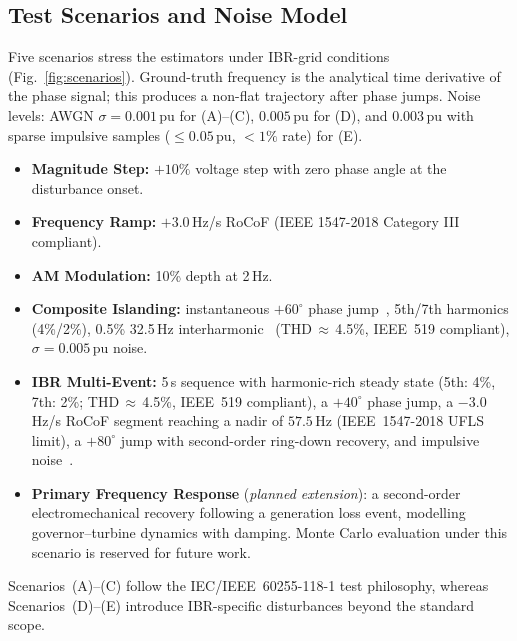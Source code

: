 \subsection{Test Scenarios and Noise Model}
\label{sec:scenarios}

Five scenarios stress the estimators under IBR-grid conditions
(Fig.~\ref{fig:scenarios}). Ground-truth frequency is the analytical
time derivative of the phase signal; this produces a non-flat trajectory
after phase jumps. Noise levels: AWGN $\sigma=0.001$\,pu for (A)--(C),
$0.005$\,pu for (D), and $0.003$\,pu with sparse impulsive samples
($\leq\!0.05$\,pu, $<\!1\%$ rate) for (E).
%
\begin{itemize}[leftmargin=*, nosep, topsep=1pt, itemsep=1pt]
  \item[\textbf{(A)}] \textbf{Magnitude Step:} $+10\%$ voltage step with
    zero phase angle at the disturbance onset.
  \item[\textbf{(B)}] \textbf{Frequency Ramp:} $+3.0$\,Hz/s RoCoF (IEEE 1547-2018 Category III compliant).
  \item[\textbf{(C)}] \textbf{AM Modulation:} 10\% depth at 2\,Hz.
  \item[\textbf{(D)}] \textbf{Composite Islanding:} instantaneous
    $+60^\circ$ phase jump~\cite{Roscoe2019}, 5th/7th harmonics (4\%/2\%),
    0.5\% 32.5\,Hz interharmonic~\cite{Bernal2024,Zoghby2024}
    (THD\,$\approx$\,4.5\%, IEEE~519 compliant), $\sigma=0.005$\,pu noise.
  \item[\textbf{(E)}] \textbf{IBR Multi-Event:} 5\,s sequence with
    harmonic-rich steady state (5th: 4\%, 7th: 2\%;
    THD\,$\approx$\,4.5\%, IEEE~519 compliant), a $+40^\circ$
    phase jump, a $-3.0$\,Hz/s RoCoF segment reaching a nadir of
    $57.5$\,Hz (IEEE~1547-2018 UFLS limit), a $+80^\circ$ jump with
    second-order ring-down recovery, and impulsive noise~\cite{Chamorro2021}.
  \item[\textbf{(F)}] \textbf{Primary Frequency Response} (\emph{planned extension}):
    a second-order electromechanical recovery following a generation loss
    event, modelling governor--turbine dynamics with damping. Monte Carlo
    evaluation under this scenario is reserved for future work.
\end{itemize}
%
Scenarios~(A)--(C) follow the IEC/IEEE~60255-118-1 test philosophy,
whereas Scenarios~(D)--(E) introduce IBR-specific disturbances beyond
the standard scope.

